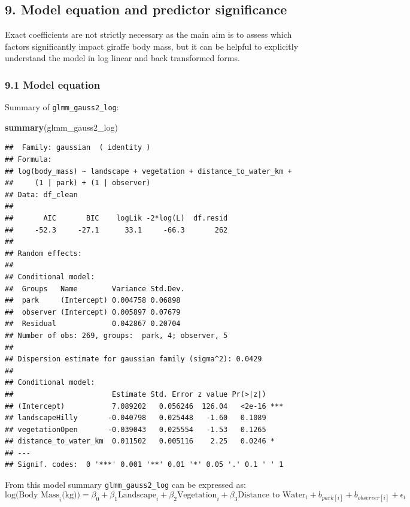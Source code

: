\documentclass[
]{article}
\newenvironment{Shaded}{\begin{snugshade}}{\end{snugshade}}
\newcommand{\FunctionTok}[1]{\textcolor[rgb]{0.13,0.29,0.53}{\textbf{#1}}}
\newcommand{\NormalTok}[1]{#1}
\begin{document}
\subsection{9. Model equation and predictor
significance}\label{model-equation-and-predictor-significance}

Exact coefficients are not strictly necessary as the main aim is to
assess which factors significantly impact giraffe body mass, but it can
be helpful to explicitly understand the model in log linear and back
transformed forms.

\subsubsection{9.1 Model equation}\label{model-equation}

Summary of \texttt{glmm\_gauss2\_log}:

\begin{Shaded}
\begin{Highlighting}[]
\FunctionTok{summary}\NormalTok{(glmm\_gauss2\_log)}
\end{Highlighting}
\end{Shaded}

\begin{verbatim}
##  Family: gaussian  ( identity )
## Formula:          
## log(body_mass) ~ landscape + vegetation + distance_to_water_km +  
##     (1 | park) + (1 | observer)
## Data: df_clean
## 
##       AIC       BIC    logLik -2*log(L)  df.resid 
##     -52.3     -27.1      33.1     -66.3       262 
## 
## Random effects:
## 
## Conditional model:
##  Groups   Name        Variance Std.Dev.
##  park     (Intercept) 0.004758 0.06898 
##  observer (Intercept) 0.005897 0.07679 
##  Residual             0.042867 0.20704 
## Number of obs: 269, groups:  park, 4; observer, 5
## 
## Dispersion estimate for gaussian family (sigma^2): 0.0429 
## 
## Conditional model:
##                       Estimate Std. Error z value Pr(>|z|)    
## (Intercept)           7.089202   0.056246  126.04   <2e-16 ***
## landscapeHilly       -0.040798   0.025448   -1.60   0.1089    
## vegetationOpen       -0.039043   0.025554   -1.53   0.1265    
## distance_to_water_km  0.011502   0.005116    2.25   0.0246 *  
## ---
## Signif. codes:  0 '***' 0.001 '**' 0.01 '*' 0.05 '.' 0.1 ' ' 1
\end{verbatim}

From this model summary \texttt{glmm\_gauss2\_log} can be expressed
as:\\
\[
\text{log(Body Mass}_{i}\text{(kg))} = \beta_0 + \beta_1\text{Landscape}_{i} + \beta_2\text{Vegetation}_{i} + \beta_3\text{Distance to Water}_{i} + b_{park[i]} + b_{observer[i]} + \epsilon_{i}
\tag{1}
\]
\end{document}
